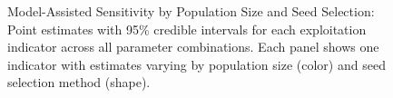 \documentclass[
  12pt,
  letterpaper,
  DIV=11,
  numbers=noendperiod]{scrartcl}
\theoremstyle{plain}
\theoremstyle{definition}
\begin{document}
\begin{figure}[H]


\caption{\label{fig-ma-sensitivity-by-indicator}Model-Assisted
Sensitivity by Population Size and Seed Selection: Point estimates with
95\% credible intervals for each exploitation indicator across all
parameter combinations. Each panel shows one indicator with estimates
varying by population size (color) and seed selection method (shape).}

\end{figure}%
\end{document}
